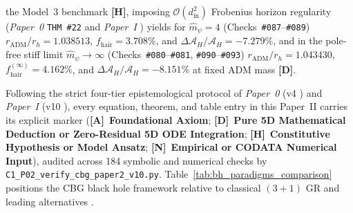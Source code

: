 \documentclass[11pt,a4paper]{article}
\newcommand{\catA}{\textbf{\textcolor{purple!80!black}{[A]}}}
\newcommand{\catD}{\textbf{\textcolor{blue!75!black}{[D]}}}
\newcommand{\catH}{\textbf{\textcolor{orange!85!black}{[H]}}}
\newcommand{\catN}{\textbf{\textcolor{teal!75!black}{[N]}}}
\theoremstyle{plain}
\theoremstyle{definition}
\theoremstyle{remark}
\numberwithin{equation}{section}
\begin{document}
\begin{enumerate}
the Model~3 benchmark \catH, imposing $\mathcal{O}(d_{\text{in}}^2)$ Frobenius horizon regularity (\textit{Paper~0} \texttt{THM~\#22} \cite{jimenez2026_p0} and \textit{Paper~I} \cite{jimenez2026a}) yields for $\hat{m}_{\psi} = 4$ (Checks~\texttt{\#087}--\texttt{\#089}) $r_{\text{ADM}}/r_h = 1.038513$, $f_{\text{hair}} = 3.708\%$, and $\Delta\mathcal{A}_H/\mathcal{A}_H = -7.279\%$, and in the pole-free stiff limit $\hat{m}_{\psi} \to \infty$ (Checks~\texttt{\#080}--\texttt{\#081}, \texttt{\#090}--\texttt{\#093}) $r_{\text{ADM}}/r_h = 1.043430$, $f_{\text{hair}}^{(\infty)} = \mathbf{4.162\%}$, and $\Delta\mathcal{A}_H/\mathcal{A}_H = \mathbf{-8.151\%}$ at fixed ADM mass \catD.
\end{enumerate}

Following the strict four-tier epistemological protocol of \textit{Paper~0} (v4 \cite{jimenez2026_p0}) and \textit{Paper~I} (v10 \cite{jimenez2026a}), every equation, theorem, and table entry in this Paper~II carries its explicit marker (\catA\ \textbf{Foundational Axiom}; \catD\ \textbf{Pure 5D Mathematical Deduction or Zero-Residual 5D ODE Integration}; \catH\ \textbf{Constitutive Hypothesis or Model Ansatz}; \catN\ \textbf{Empirical or CODATA Numerical Input}), audited across 184 symbolic and numerical checks by \allowbreak\texttt{C1\_P02\_verify\_cbg\_paper2\_v10.py}. Table~\ref{tab:bh_paradigms_comparison} positions the CBG black hole framework relative to classical $(3+1)$ GR and leading alternatives \cite{mathur2005,mazur2004,rovelli2014,ashtekar2018,paiman2023,kak2025}.
\end{document}
